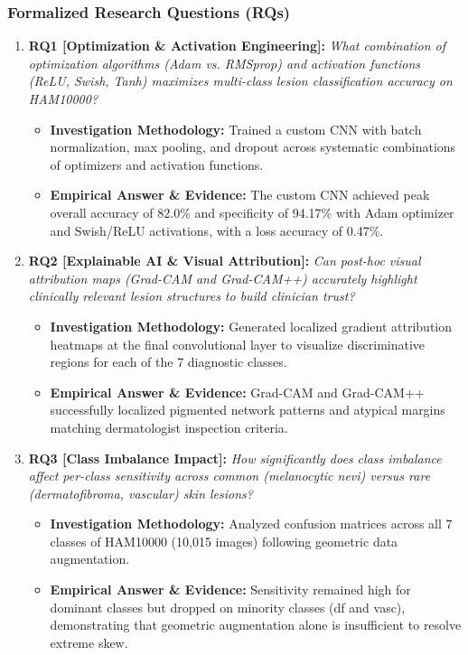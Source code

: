 \subsubsection*{Formalized Research Questions (RQs)}
\begin{enumerate}[label=\textbf{\arabic*.}, leftmargin=*]
  \item \textbf{RQ1 [Optimization \& Activation Engineering]:} \textit{What combination of optimization algorithms (Adam vs. RMSprop) and activation functions (ReLU, Swish, Tanh) maximizes multi-class lesion classification accuracy on HAM10000?}
  \begin{itemize}[leftmargin=1.5em]
    \item \textbf{Investigation Methodology:} Trained a custom CNN with batch normalization, max pooling, and dropout across systematic combinations of optimizers and activation functions.
    \item \textbf{Empirical Answer \& Evidence:} The custom CNN achieved peak overall accuracy of 82.0\% and specificity of 94.17\% with Adam optimizer and Swish/ReLU activations, with a loss accuracy of 0.47\%.
  \end{itemize}
  \item \textbf{RQ2 [Explainable AI \& Visual Attribution]:} \textit{Can post-hoc visual attribution maps (Grad-CAM and Grad-CAM++) accurately highlight clinically relevant lesion structures to build clinician trust?}
  \begin{itemize}[leftmargin=1.5em]
    \item \textbf{Investigation Methodology:} Generated localized gradient attribution heatmaps at the final convolutional layer to visualize discriminative regions for each of the 7 diagnostic classes.
    \item \textbf{Empirical Answer \& Evidence:} Grad-CAM and Grad-CAM++ successfully localized pigmented network patterns and atypical margins matching dermatologist inspection criteria.
  \end{itemize}
  \item \textbf{RQ3 [Class Imbalance Impact]:} \textit{How significantly does class imbalance affect per-class sensitivity across common (melanocytic nevi) versus rare (dermatofibroma, vascular) skin lesions?}
  \begin{itemize}[leftmargin=1.5em]
    \item \textbf{Investigation Methodology:} Analyzed confusion matrices across all 7 classes of HAM10000 (10,015 images) following geometric data augmentation.
    \item \textbf{Empirical Answer \& Evidence:} Sensitivity remained high for dominant classes but dropped on minority classes (df and vasc), demonstrating that geometric augmentation alone is insufficient to resolve extreme skew.

\end{itemize}
\end{enumerate}
